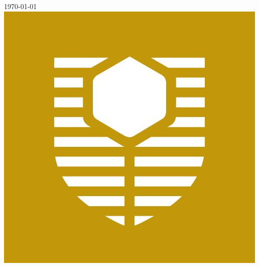 \begin{titlepage}

{\large \today}\\[3cm] %


\includegraphics[scale=0.25]{Curtin2}
 

\vfill %

\end{titlepage}

